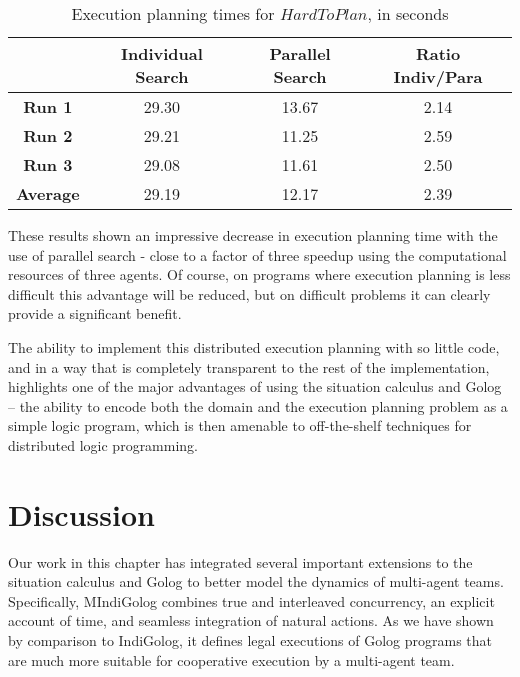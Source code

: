 %
\begin{table}[!t]
 

\begin{centering}
\begin{tabular}{|c|c|c|c|}
\hline 
 & \textbf{Individual Search}  & \textbf{Parallel Search}  & \textbf{Ratio Indiv/Para}\tabularnewline
\hline
\hline 
\textbf{Run 1}  & 29.30  & 13.67  & 2.14\tabularnewline
\hline 
\textbf{Run 2}  & 29.21  & 11.25  & 2.59\tabularnewline
\hline 
\textbf{Run 3}  & 29.08  & 11.61  & 2.50\tabularnewline
\hline
\hline 
\textbf{Average}  & 29.19  & 12.17  & 2.39\tabularnewline
\hline
\end{tabular}
\par\end{centering}

\caption{Execution planning times for $HardToPlan$, in seconds\label{tab:MIndiGolog:Execution-planning-times}}

\end{table}


These results shown an impressive decrease in execution planning time
with the use of parallel search - close to a factor of three speedup
using the computational resources of three agents. Of course, on programs
where execution planning is less difficult this advantage will be
reduced, but on difficult problems it can clearly provide a significant
benefit.

The ability to implement this distributed execution planning with
so little code, and in a way that is completely transparent to the
rest of the implementation, highlights one of the major advantages
of using the situation calculus and Golog -- the ability to encode
both the domain and the execution planning problem as a simple logic
program, which is then amenable to off-the-shelf techniques for distributed
logic programming.


\section{Discussion\label{sec:MIndiGolog:Discussion}}

Our work in this chapter has integrated several important extensions
to the situation calculus and Golog to better model the dynamics of
multi-agent teams. Specifically, MIndiGolog combines true and interleaved
concurrency, an explicit account of time, and seamless integration
of natural actions. As we have shown by comparison to IndiGolog, it
defines legal executions of Golog programs that are much more suitable
for cooperative execution by a multi-agent team.

